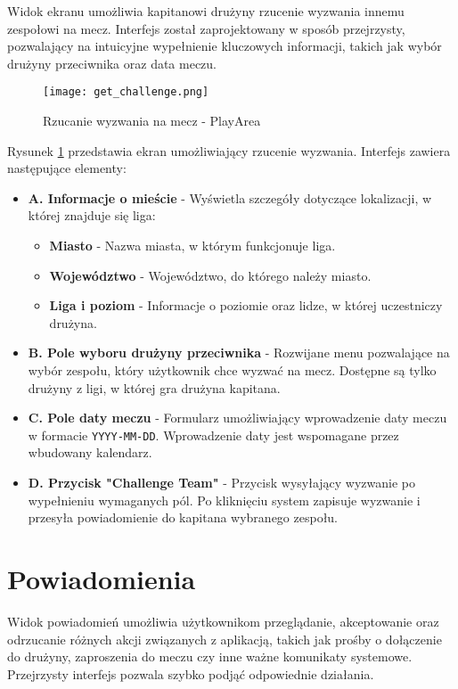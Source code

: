 \documentclass[wmii,inf,inz]{uwmthesis} %
\begin{document}
Widok ekranu umożliwia kapitanowi drużyny rzucenie wyzwania innemu zespołowi na mecz. Interfejs został zaprojektowany w sposób przejrzysty, pozwalający na intuicyjne wypełnienie kluczowych informacji, takich jak wybór drużyny przeciwnika oraz data meczu.

\begin{figure}[H]
    \centering
    \texttt{[image: get\_challenge.png]}
    \caption{Rzucanie wyzwania na mecz - PlayArea}
    \label{fig:challenge_match}
\end{figure}

\noindent
Rysunek \ref{fig:challenge_match} przedstawia ekran umożliwiający rzucenie wyzwania. Interfejs zawiera następujące elementy:
\begin{itemize}
    \item \textbf{A. Informacje o mieście} - Wyświetla szczegóły dotyczące lokalizacji, w której znajduje się liga:
    \begin{itemize}[label=$\cdot$]
        \item \textbf{Miasto} - Nazwa miasta, w którym funkcjonuje liga.
        \item \textbf{Województwo} - Województwo, do którego należy miasto.
        \item \textbf{Liga i poziom} - Informacje o poziomie oraz lidze, w której uczestniczy drużyna.
    \end{itemize}
    \item \textbf{B. Pole wyboru drużyny przeciwnika} - Rozwijane menu pozwalające na wybór zespołu, który użytkownik chce wyzwać na mecz. Dostępne są tylko drużyny z ligi, w której gra drużyna kapitana.
    \item \textbf{C. Pole daty meczu} - Formularz umożliwiający wprowadzenie daty meczu w formacie \texttt{YYYY-MM-DD}. Wprowadzenie daty jest wspomagane przez wbudowany kalendarz.
    \item \textbf{D. Przycisk "Challenge Team"} - Przycisk wysyłający wyzwanie po wypełnieniu wymaganych pól. Po kliknięciu system zapisuje wyzwanie i przesyła powiadomienie do kapitana wybranego zespołu.
\end{itemize}

\section{Powiadomienia}

Widok powiadomień umożliwia użytkownikom przeglądanie, akceptowanie oraz odrzucanie różnych akcji związanych z aplikacją, takich jak prośby o dołączenie do drużyny, zaproszenia do meczu czy inne ważne komunikaty systemowe. Przejrzysty interfejs pozwala szybko podjąć odpowiednie działania.
\end{document}
